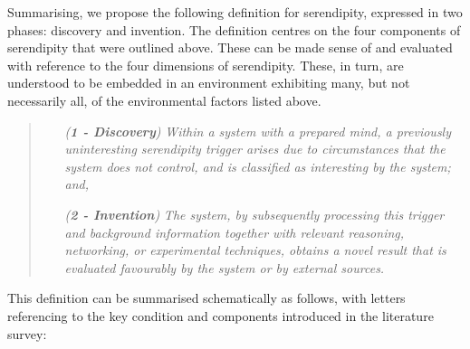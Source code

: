 Summarising, we propose the following definition for serendipity,
expressed in two phases: discovery and invention.  The definition
centres on the four components of serendipity that were outlined
above.  These can be made sense of and evaluated with reference to the
four dimensions of serendipity.  These, in turn, are understood to be
embedded in an environment exhibiting many, but not necessarily all,
of the environmental factors listed above.

\begin{quote}
\begin{enumerate}[itemsep=2pt,labelwidth=9em,leftmargin=9em,rightmargin=2em]
\item[\emph{(\textbf{1 - Discovery})}] \emph{Within a system with a prepared mind, a previously uninteresting serendipity trigger arises due to circumstances that the system does not control, and is classified as interesting by the system; and,}
\item[\emph{(\textbf{2 - Invention})}] \emph{The system, by subsequently processing this trigger and background information together with relevant reasoning, networking, or experimental techniques, obtains a novel result that is evaluated favourably by the system or by external sources.}
\end{enumerate}
\end{quote}

\noindent This definition can be summarised schematically as follows, with letters referencing to the key condition and components introduced in the literature survey: 

{\centering

\par}


